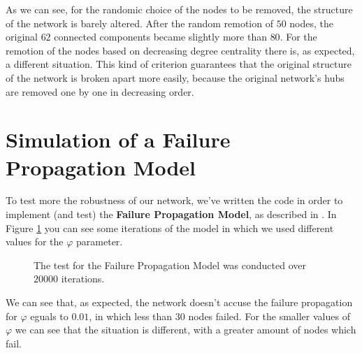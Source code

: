        As we can see, for the randomic choice of the nodes to be removed, the structure of the network is barely
        altered. After the random remotion of $50$ nodes, the original $62$ connected components became slightly
        more than $80$. For the remotion of the nodes based on decreasing degree centrality there is, as expected,
        a different situation. This kind of criterion guarantees that the original structure of the network is
        broken apart more easily, because the original network's hubs are removed one by one in decreasing order.
    \section{Simulation of a Failure Propagation Model} %
    \label{sec:simulation_of_a_failure_propagation_model}
        To test more the robustness of our network, we've written the code in order to implement (and test) the
        \textbf{Failure Propagation Model}, as described in \cite{network_science}. In Figure \ref{fail_prop_model}
        you can see some iterations of the model in which we used different values for the $\varphi$ parameter.

        \begin{figure}[H]
            \centering
            \begin{subfigure}{0.50\textwidth}
            \end{subfigure}
            \caption{The test for the Failure Propagation Model was conducted over $20000$ iterations.}
            \label{fail_prop_model}
        \end{figure}

        We can see that, as expected, the network doesn't accuse the failure propagation for $\varphi$ eguals to
        $0.01$, in which less than $30$ nodes failed. For the smaller values of $\varphi$ we can see that the
        situation is different, with a greater amount of nodes which fail.
